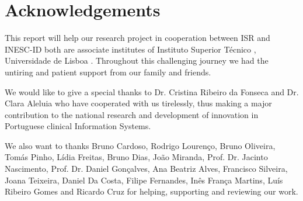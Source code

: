 \clearpage

\section{Acknowledgements}

This report will help our research project in cooperation between ISR \cite{isr} and INESC-ID \cite{inescid} both are associate institutes of Instituto Superior T\'{e}cnico \cite{ist}, Universidade de Lisboa \cite{ul}. Throughout this challenging journey we had the untiring and patient support from our family and friends.

We would like to give a special thanks to Dr. Cristina Ribeiro da Fonseca and Dr. Clara Aleluia who have cooperated with us tirelessly, thus making a major contribution to the national research and development of innovation in Portuguese clinical Information Systems.

We also want to thanks Bruno Cardoso, Rodrigo Louren\c{c}o, Bruno Oliveira, Tom\'{a}s Pinho, L\'{i}dia Freitas, Bruno Dias, Jo\~{a}o Miranda, Prof. Dr. Jacinto Nascimento, Prof. Dr. Daniel Gon\c{c}alves, Ana Beatriz Alves, Francisco Silveira, Joana Teixeira, Daniel Da Costa, Filipe Fernandes, In\^{e}s Fran\c{c}a Martins, Lu\'{i}s Ribeiro Gomes and Ricardo Cruz for helping, supporting and reviewing our work.

\clearpage

\printbibliography


